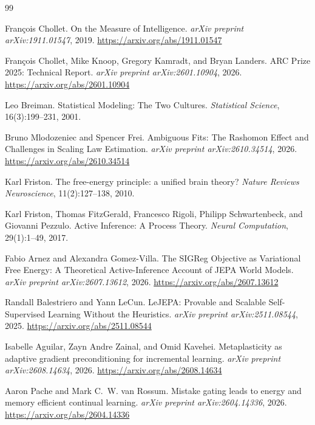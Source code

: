 \documentclass[10pt,a4paper]{article}
\begin{document}
\begin{thebibliography}{99}
\small

François Chollet.
\newblock On the Measure of Intelligence.
\newblock \emph{arXiv preprint arXiv:1911.01547}, 2019. \url{https://arxiv.org/abs/1911.01547}

François Chollet, Mike Knoop, Gregory Kamradt, and Bryan Landers.
\newblock ARC Prize 2025: Technical Report.
\newblock \emph{arXiv preprint arXiv:2601.10904}, 2026. \url{https://arxiv.org/abs/2601.10904}

Leo Breiman.
\newblock Statistical Modeling: The Two Cultures.
\newblock \emph{Statistical Science}, 16(3):199--231, 2001.

Bruno Mlodozeniec and Spencer Frei.
\newblock Ambiguous Fits: The Rashomon Effect and Challenges in Scaling Law Estimation.
\newblock \emph{arXiv preprint arXiv:2610.34514}, 2026. \url{https://arxiv.org/abs/2610.34514}

Karl Friston.
\newblock The free-energy principle: a unified brain theory?
\newblock \emph{Nature Reviews Neuroscience}, 11(2):127--138, 2010.

Karl Friston, Thomas FitzGerald, Francesco Rigoli, Philipp Schwartenbeck, and Giovanni Pezzulo.
\newblock Active Inference: A Process Theory.
\newblock \emph{Neural Computation}, 29(1):1--49, 2017.

Fabio Arnez and Alexandra Gomez-Villa.
\newblock The SIGReg Objective as Variational Free Energy: A Theoretical Active-Inference Account of JEPA World Models.
\newblock \emph{arXiv preprint arXiv:2607.13612}, 2026. \url{https://arxiv.org/abs/2607.13612}

Randall Balestriero and Yann LeCun.
\newblock LeJEPA: Provable and Scalable Self-Supervised Learning Without the Heuristics.
\newblock \emph{arXiv preprint arXiv:2511.08544}, 2025. \url{https://arxiv.org/abs/2511.08544}

Isabelle Aguilar, Zayn Andre Zainal, and Omid Kavehei.
\newblock Metaplasticity as adaptive gradient preconditioning for incremental learning.
\newblock \emph{arXiv preprint arXiv:2608.14634}, 2026. \url{https://arxiv.org/abs/2608.14634}

Aaron Pache and Mark C.~W. van Rossum.
\newblock Mistake gating leads to energy and memory efficient continual learning.
\newblock \emph{arXiv preprint arXiv:2604.14336}, 2026. \url{https://arxiv.org/abs/2604.14336}


\end{thebibliography}
\end{document}
